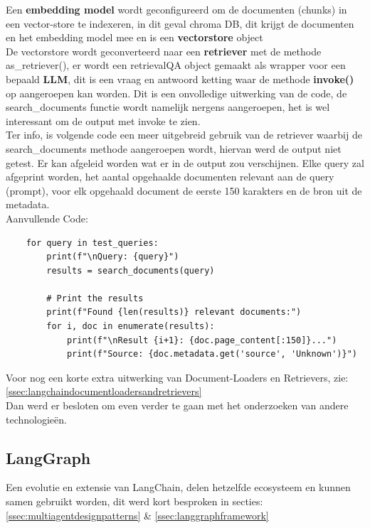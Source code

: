 Een \textbf{embedding model} wordt geconfigureerd om de documenten (chunks) in een vector-store te indexeren, in dit geval chroma DB, dit krijgt de documenten en het embedding model mee en is een \textbf{vectorstore} object \\

De vectorstore wordt geconverteerd naar een \textbf{retriever} met de methode as\_retriever(), er wordt een retrievalQA object gemaakt als wrapper voor een bepaald \textbf{LLM}, dit is een vraag en antwoord ketting waar de methode \textbf{invoke()} op aangeroepen kan worden. Dit is een onvolledige uitwerking van de code, de search\_documents functie wordt namelijk nergens aangeroepen, het is wel interessant om de output met invoke te zien.\\

Ter info, is volgende code een meer uitgebreid gebruik van de retriever waarbij de search\_documents methode aangeroepen wordt, hiervan werd de output niet getest. Er kan afgeleid worden wat er in de output zou verschijnen. Elke query zal afgeprint worden, het aantal opgehaalde documenten relevant aan de query (prompt), voor elk opgehaald document de eerste 150 karakters en de bron uit de metadata. \\

Aanvullende Code:

\begin{verbatim}
    for query in test_queries:
        print(f"\nQuery: {query}")
        results = search_documents(query)
        
        # Print the results
        print(f"Found {len(results)} relevant documents:")
        for i, doc in enumerate(results):
            print(f"\nResult {i+1}: {doc.page_content[:150]}...")
            print(f"Source: {doc.metadata.get('source', 'Unknown')}")
\end{verbatim}

Voor nog een korte extra uitwerking van Document-Loaders en Retrievers, zie: \ref{ssec:langchaindocumentloadersandretrievers} \\

Dan werd er besloten om even verder te gaan met het onderzoeken van andere technologieën.

\subsection{LangGraph}
\label{ssec:langgraph}
Een evolutie en extensie van LangChain, delen hetzelfde ecosysteem en kunnen samen gebruikt worden, dit werd kort besproken in secties: \ref{ssec:multiagentdesignpatterns} \& \ref{ssec:langgraphframework}

